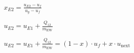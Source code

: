\( x_{E2} = \frac{u_{E2} - u_f}{u_g - u_f} \)  

\( u_{E2} = u_{E1} + \frac{Q_{12}}{m_{\text{EW}}} \)  

\( u_{E2} = u_{E1} + \frac{Q_{12}}{m_{\text{EW}}} = (1 - x) \cdot u_f + x \cdot u_{\text{next}} \)